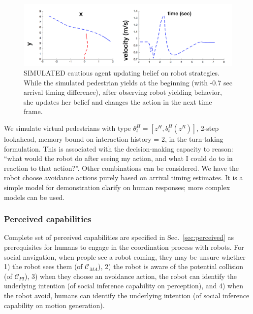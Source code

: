 \documentclass[letterpaper, 10 pt, conference]{ieeeconf}  %
\begin{document}
   \begin{figure}[t]
      \centering
      \hspace{-5em}
      \vspace{-1.3em}
      \includegraphics[scale=0.33]{adaptation}
      \hspace{-5em}
      \caption{SIMULATED cautious agent updating belief on robot strategies. While the simulated pedestrian yields at the 
      beginning (with -0.7 sec arrival timing difference), after observing 
      robot yielding behavior, she updates her 
      belief and changes the action in the next time frame.}
      \vspace{-1.5em}
     \label{fig:adaptation}
   \end{figure}
We simulate virtual pedestrians with type $\theta^H_t = [z^H, b^H_t(z^R)]$, 2-step 
lookahead, memory bound on interaction history = 2,  
in the turn-taking formulation. This is associated with the decision-making 
capacity to reason: ``what would the robot do after seeing my action, and what 
I could do to in reaction to that action?''. Other combinations can be 
considered. 
We have the robot 
choose avoidance actions purely based on arrival timing estimates. It is a  simple model for demonstration clarify on human 
responses; more complex models can be used.

\subsubsection{Perceived capabilities}
Complete set of perceived capabilities are specified in Sec.~\ref{sec:perceived} as 
prerequisites for humans to engage in the coordination process with robots. 
For social navigation, when people see a robot coming, they may be unsure 
whether 1) the robot sees them (of $\mathcal{C}_{MA}$), 2) the robot is aware of the potential 
collision (of $\mathcal{C}_{PI}$), 3) when they choose an avoidance action, the robot can identify the underlying 
intention (of social inference capability on perception), and 4) when the robot 
avoid, humans can identify the underlying intention (of social inference 
capability on motion generation). 
\end{document}
